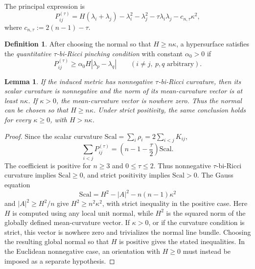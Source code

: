 \documentclass[11pt,reqno]{amsart}
\newtheorem{lemma}[proposition]{Lemma}
\theoremstyle{definition}
\newtheorem{definition}[proposition]{Definition}
\theoremstyle{remark}
\numberwithin{equation}{section}
\begin{document}
The principal expression is
\begin{equation}\label{eq:Ptau-expanded}
 P_{ij}^{(\tau)}
 =H(\lambda_i+\lambda_j)-\lambda_i^2-\lambda_j^2
  -\tau\lambda_i\lambda_j-c_{n,\tau}\kappa^2,
\end{equation}
where $c_{n,\tau}:=2(n-1)-\tau$.

\begin{definition}
After choosing the normal so that $H\geq n\kappa$, a hypersurface satisfies the
\emph{quantitative $\tau$-bi-Ricci pinching condition} with constant
$\alpha_0>0$ if
\begin{equation}\label{eq:uniform-taubiric}
 P_{ij}^{(\tau)}
 \geq\alpha_0 H|\lambda_p-\lambda_q|
 \qquad(i\ne j,\ p,q\text{ arbitrary}).
\end{equation}
\end{definition}

\begin{lemma}%
\label{lem:taubiric-mean-convex}
If the induced metric has nonnegative $\tau$-bi-Ricci curvature, then its
scalar curvature is nonnegative and the norm of its mean-curvature vector is
at least $n\kappa$.  If $\kappa>0$, the mean-curvature vector is nowhere zero.
Thus the normal can be chosen so
that $H\geq n\kappa$.  Under strict positivity, the same conclusion holds for
every $\kappa\geq0$, with $H>n\kappa$.
\end{lemma}

\begin{proof}
Since the scalar curvature $\mathrm{Scal}=\sum_i\rho_i=2\sum_{i<j}K_{ij}$,
\begin{equation*}
 \sum_{i<j}P_{ij}^{(\tau)}
 =\left(n-1-\frac\tau2\right)\mathrm{Scal}.
\end{equation*}
The coefficient is positive for $n\geq3$ and $0\leq\tau\leq2$.  Thus
nonnegative $\tau$-bi-Ricci curvature implies $\mathrm{Scal}\geq0$, and
strict positivity implies $\mathrm{Scal}>0$.  The Gauss equation
\begin{equation*}
 \mathrm{Scal}=H^2-|A|^2-n(n-1)\kappa^2
\end{equation*}
and $|A|^2\geq H^2/n$ give $H^2\geq n^2\kappa^2$, with strict inequality in
the positive case.  Here $H$ is computed using any local unit normal, while
$H^2$ is the squared norm of the globally defined mean-curvature vector.  If
$\kappa>0$, or if the curvature condition is strict, this vector is nowhere
zero and trivializes the normal line bundle.  Choosing the resulting global
normal so that $H$ is positive gives the stated inequalities.  In the
Euclidean nonnegative case, an orientation with $H\geq0$ must instead be
imposed as a separate hypothesis.
\end{proof}
\end{document}
